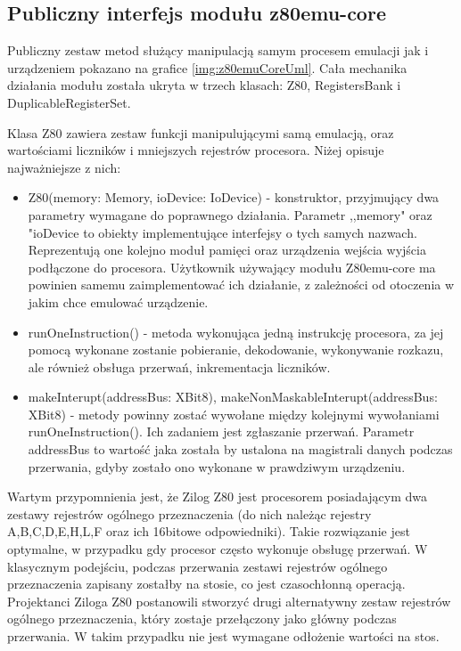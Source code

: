 	\subsection{Publiczny interfejs modułu z80emu-core}
	Publiczny zestaw metod służący manipulacją samym procesem emulacji jak i urządzeniem pokazano na grafice \ref{img:z80emuCoreUml}. Cała mechanika działania modułu została ukryta w trzech klasach: Z80, RegistersBank i DuplicableRegisterSet. 
	
	Klasa Z80 zawiera zestaw funkcji manipulującymi samą emulacją, oraz wartościami liczników i mniejszych rejestrów procesora. Niżej opisuje najważniejsze z nich:
	\begin{itemize}  
		\item Z80(memory: Memory, ioDevice: IoDevice) - konstruktor, przyjmujący dwa parametry wymagane do poprawnego działania. Parametr ,,memory" oraz "ioDevice to obiekty implementujące interfejsy o tych samych nazwach. Reprezentują one kolejno moduł pamięci oraz urządzenia wejścia wyjścia podłączone do procesora. Użytkownik używający modułu Z80emu-core ma powinien samemu zaimplementować ich działanie, z zależności od otoczenia w jakim chce emulować urządzenie. 
		
		\item runOneInstruction() - metoda wykonująca jedną instrukcję procesora, za jej pomocą wykonane zostanie pobieranie, dekodowanie, wykonywanie rozkazu, ale również obsługa przerwań, inkrementacja liczników.
		
		\item makeInterupt(addressBus: XBit8), makeNonMaskableInterupt(addressBus: XBit8) - metody powinny zostać wywołane między kolejnymi wywołaniami runOneInstruction(). Ich zadaniem jest zgłaszanie przerwań. Parametr addressBus to wartość jaka została by ustalona na magistrali danych podczas przerwania, gdyby zostało ono wykonane w prawdziwym urządzeniu.
	\end{itemize}
	
	Wartym przypomnienia jest, że Zilog Z80 jest procesorem posiadającym dwa zestawy rejestrów ogólnego przeznaczenia (do nich należąc rejestry A,B,C,D,E,H,L,F oraz ich 16bitowe odpowiedniki). Takie rozwiązanie jest optymalne, w przypadku gdy procesor często wykonuje obsługę przerwań. W klasycznym podejściu, podczas przerwania zestawi rejestrów ogólnego przeznaczenia zapisany zostałby na stosie, co jest czasochłonną operacją. Projektanci Ziloga Z80 postanowili stworzyć drugi alternatywny zestaw rejestrów ogólnego przeznaczenia, który zostaje przełączony jako główny podczas przerwania. W takim przypadku nie jest wymagane odłożenie wartości na stos.
	
